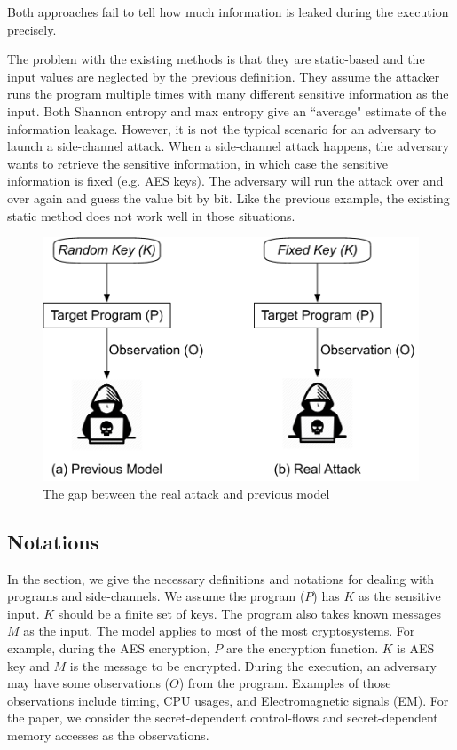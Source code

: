 Both approaches fail to tell how 
much information is leaked during the execution precisely.

The problem with the existing methods is that they are static-based and the 
input values are neglected by the previous definition. 
They assume the attacker runs the program multiple times with many different sensitive 
information as the input. Both Shannon entropy and max entropy give an ``average" 
estimate of the information leakage. However, it is not the typical scenario for an adversary to 
launch a side-channel attack. When a side-channel attack happens, the adversary wants 
to retrieve the sensitive information, in which case the sensitive information is fixed (e.g. AES keys). 
The adversary will run the attack over and over again and guess the value bit by bit. Like the 
previous example, the existing static method does not work well in those situations.

\begin{figure}
  \centering
   \includegraphics[width=.9\columnwidth]{./figures/RA.pdf}
   \caption{The gap between the real attack and previous model}
\end{figure}


\subsection{Notations}
In the section, we give the necessary definitions and notations for dealing 
with programs and side-channels.
We assume the program ($P$) has $K$ as the sensitive input. 
$K$ should be a finite set of keys. The program also takes known messages $M$ as the input. The model applies to most of the most cryptosystems. For example,
during the AES encryption, $P$ are the encryption function. $K$ is AES key and
$M$ is the message to be encrypted. During the execution, an adversary may have some observations ($O$) from the program. Examples of those observations
include timing, CPU usages, and Electromagnetic signals (EM). For the paper, we
consider the secret-dependent control-flows and secret-dependent memory accesses
as the observations.

